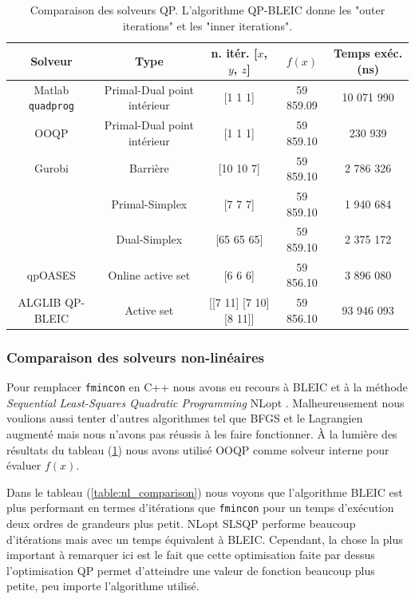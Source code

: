 \begin{table}[htp]
	\centering
	\begin{tabular}{ |c|c|c|c|c| } 
 \hline
 Solveur & Type & n. itér. [$x$, $y$, $z$] & $f(x)$ & Temps exéc. (ns) \\ 
 \hline
	Matlab \texttt{quadprog} & Primal-Dual point intérieur & [1 1 1] & 59 859.09 & 10 071 990  \\
	OOQP & Primal-Dual point intérieur & [1 1 1] & 59 859.10 & 230 939\\
	Gurobi & Barrière & [10 10 7] & 59 859.10 & 2 786 326\\
	& Primal-Simplex & [7 7 7] & 59 859.10 & 1 940 684\\
	& Dual-Simplex & [65 65 65] & 59 859.10 & 2 375 172\\
	qpOASES & Online active set & [6 6 6] & 59 856.10 & 3 896 080\\
	ALGLIB QP-BLEIC & Active set& [[7 11] [7 10] [8 11]] & 59 856.10 & 93 946 093\\
 \hline
\end{tabular}
	\caption{Comparaison des solveurs QP. L'algorithme QP-BLEIC donne les "outer iterations" et les "inner iterations".}
	\label{table:qp_comparison}
\end{table}

\subsubsection{Comparaison des solveurs non-linéaires}
Pour remplacer \texttt{fmincon} en C++ nous avons eu recours à BLEIC et à la méthode \textit{Sequential Least-Squares Quadratic Programming} NLopt \cite{nlopt}. Malheureusement nous voulions aussi tenter d'autres algorithmes tel que BFGS et le Lagrangien augmenté mais nous n'avons pas réussis à les faire fonctionner. À la lumière des résultats du tableau (\ref{table:qp_comparison}) nous avons utilisé OOQP comme solveur interne pour évaluer $f(x)$.

Dans le tableau (\ref{table:nl_comparison}) nous voyons que l'algorithme BLEIC est plus performant en termes d'itérations que \texttt{fmincon} pour un temps d'exécution deux ordres de grandeurs plus petit. NLopt SLSQP performe beaucoup d'itérations mais avec un temps équivalent à BLEIC. Cependant, la chose la plus important à remarquer ici est le fait que cette optimisation faite par dessus l'optimisation QP permet d'atteindre une valeur de fonction beaucoup plus petite, peu importe l'algorithme utilisé.

